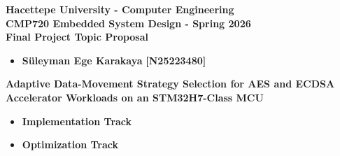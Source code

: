\documentclass[11pt]{article}
\newcommand{\PlaceholderBox}[3]{%
  \begin{tcolorbox}[proposalbox,title={#1}]
    #2
    \vspace{0.2\baselineskip}
    #3
  \end{tcolorbox}%
}
\newcommand{\checkbox}{\ding{113}}
\newcommand{\checkedbox}{\ding{113}\hspace{-1.6ex}\raisebox{0.2ex}{\scalebox{1.7}{\ding{51}\hspace{-0.8ex}}}}
\begin{document}
\begin{center}
  {\LARGE \textbf{Hacettepe University - Computer Engineering}}\\
  {\LARGE \textbf{CMP720 Embedded System Design - Spring 2026}}\\
  \vspace{0.5cm}
  {\Large \textbf{Final Project Topic Proposal}}\\
  \vspace{0.5\baselineskip}
\end{center}

\PlaceholderBox
  {Group Members}
  {}
  {\begin{itemize}[leftmargin=*]
    \item \textbf{Süleyman Ege Karakaya} \textbf{[N25223480]}
  \end{itemize}}

\PlaceholderBox
  {Project Topic Title}
  {}
  {\textbf{Adaptive Data-Movement Strategy Selection for AES and ECDSA Accelerator Workloads on an STM32H7-Class MCU}}

\begin{tcolorbox}[proposalbox,title={Project Track (choose one)}]
  \begin{itemize}[leftmargin=*]
    \item[\checkbox] \textbf{Implementation Track}
    \item[\checkedbox] \textbf{Optimization Track}
  \end{itemize}
\end{tcolorbox}
\end{document}
